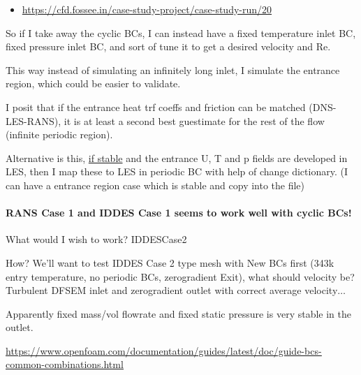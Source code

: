 \documentclass[12pt]{article}
\renewcommand{\_}{\kern-1.5pt\textunderscore\kern-1.5pt}
\begin{document}
\begin{itemize}
	\item \href{https://cfd.fossee.in/case-study-project/case-study-run/20}{https://cfd.fossee.in/case-study-project/case-study-run/20}\par

\end{itemize}

\vspace{\baselineskip}
So if I take away the cyclic BCs, I can instead have a fixed temperature inlet BC, fixed pressure inlet BC, and sort of tune it to get a desired velocity and Re.\par


\vspace{\baselineskip}
This way instead of simulating an infinitely long inlet, I simulate the entrance region, which could be easier to validate.\par

I posit that if the entrance heat trf coeffs and friction can be matched (DNS-LES-RANS), it is at least a second best guestimate for the rest of the flow (infinite periodic region).\par

Alternative is this, \uline{if stable} and the entrance U, T and p fields are developed in LES, then I map these to LES in periodic BC with help of change dictionary. (I can have a entrance region case which is stable and copy into the file)\par


\vspace{\baselineskip}
\paragraph{RANS Case 1 and IDDES Case 1 seems to work well with cyclic BCs!}  \par


What would I wish to work? IDDESCase2\par

How? We’ll want to test IDDES Case 2 type mesh with New BCs first (343k entry temperature, no periodic BCs, zerogradient Exit), what should velocity be? Turbulent DFSEM inlet and zerogradient outlet with correct average velocity$ \ldots $ \par

Apparently fixed mass/vol flowrate and fixed static pressure is very stable in the outlet.\par

\href{https://www.openfoam.com/documentation/guides/latest/doc/guide-bcs-common-combinations.html}{\textcolor[HTML]{0000FF}{\ul{https://www.openfoam.com/documentation/guides/latest/doc/guide-bcs-common-combinations.html}}}\par
\end{document}
